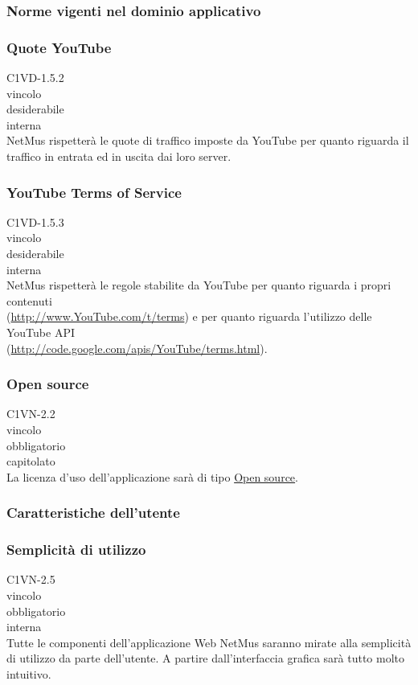 \subsubsection{Norme vigenti nel dominio applicativo}

\subsubsection*{Quote YouTube}
 C1VD-1.5.2 \\
 vincolo \\
 desiderabile \\
 interna \\
NetMus rispetter\`a le quote di traffico imposte da YouTube per quanto riguarda
il traffico in entrata ed in uscita dai loro server.

\subsubsection*{YouTube Terms of Service}
 C1VD-1.5.3 \\
 vincolo \\
 desiderabile \\
 interna \\
NetMus rispetter\`a le regole stabilite da YouTube per quanto riguarda i
propri contenuti \\(\url{http://www.YouTube.com/t/terms}) e per quanto
riguarda l'utilizzo delle YouTube API\\
(\url{http://code.google.com/apis/YouTube/terms.html}).

\subsubsection*{Open source}
 C1VN-2.2 \\
 vincolo \\
 obbligatorio \\
 capitolato \\
La licenza d'uso dell'applicazione sar\`a di tipo \underline{Open source}.

\subsubsection{Caratteristiche dell'utente}

\subsubsection*{Semplicit\`a di utilizzo}
 C1VN-2.5 \\
 vincolo \\
 obbligatorio \\
 interna \\
Tutte le componenti dell'applicazione Web NetMus saranno mirate alla semplicit\`a
di utilizzo da parte dell'utente. A partire dall'interfaccia grafica sar\`a tutto
molto intuitivo.

